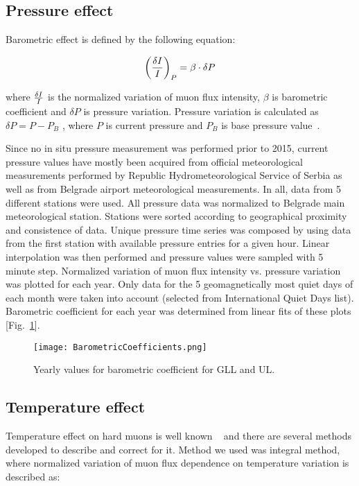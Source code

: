 \documentclass[twocolumn,twoside,slac_two]{revtex4}
\begin{document}
\subsection{Pressure effect}
Barometric effect is defined by the following equation:

\begin{equation}\label{eq:units}
\left({\delta I\over I}\right)_P = \beta \cdot \delta P
\end{equation}

where $\delta I \over I$ is the normalized variation of muon flux intensity, $\beta$ is barometric coefficient and $\delta P$ is pressure variation. Pressure variation is calculated as $\delta P = P - P_B$ , where $P$ is current pressure and $P_B$ is base pressure value~\cite{ref-4}.
 
Since no in situ pressure measurement was performed prior to 2015, current pressure values have mostly been acquired from official meteorological measurements performed by Republic Hydrometeorological Service of Serbia as well as from Belgrade airport meteorological measurements. In all, data from 5 different stations were used. All pressure data was normalized to Belgrade main meteorological station. Stations were sorted according to geographical proximity and consistence of data. Unique pressure time series was composed by using data from the first station with available pressure entries for a given hour. Linear interpolation was then performed and pressure values were sampled with 5 minute step.
Normalized variation of muon flux intensity vs. pressure variation was plotted for each year. Only data for the 5 geomagnetically most quiet days of each month were taken into account (selected from International Quiet Days list). Barometric coefficient for each year was determined from linear fits of these plots [Fig.~\ref{Barometric_coefficients}].

\begin{figure}[h]
\centering
\texttt{[image: BarometricCoefficients.png]}
\caption{Yearly values for barometric coefficient for GLL and UL.} 
\label{Barometric_coefficients}
\end{figure}

\subsection{Temperature effect}
Temperature effect on hard muons is well known ~\cite{ref-2} and there are several methods developed to describe and correct for it. Method we used was integral method, where normalized variation of muon flux dependence on temperature variation is described as: 
\end{document}
